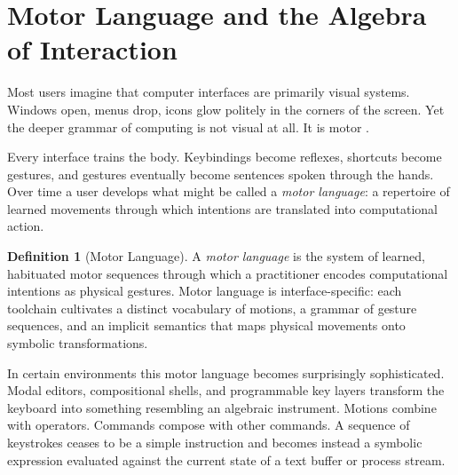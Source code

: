 \documentclass[12pt]{article}
\theoremstyle{definition}
\newtheorem{definition}{Definition}[section]
\begin{document}
\section{Motor Language and the Algebra of Interaction}

Most users imagine that computer interfaces are primarily visual systems.
Windows open, menus drop, icons glow politely in the corners of the
screen. Yet the deeper grammar of computing is not visual at all. It is
motor \cite{norman1988}.

Every interface trains the body. Keybindings become reflexes, shortcuts
become gestures, and gestures eventually become sentences spoken through
the hands. Over time a user develops what might be called a
\emph{motor language}: a repertoire of learned movements through which
intentions are translated into computational action.

\begin{definition}[Motor Language]
A \emph{motor language} is the system of learned, habituated motor
sequences through which a practitioner encodes computational intentions
as physical gestures. Motor language is interface-specific: each
toolchain cultivates a distinct vocabulary of motions, a grammar of
gesture sequences, and an implicit semantics that maps physical movements
onto symbolic transformations.
\end{definition}

In certain environments this motor language becomes surprisingly
sophisticated. Modal editors, compositional shells, and programmable
key layers transform the keyboard into something resembling an algebraic
instrument. Motions combine with operators. Commands compose with other
commands. A sequence of keystrokes ceases to be a simple instruction
and becomes instead a symbolic expression evaluated against the current
state of a text buffer or process stream.
\end{document}

